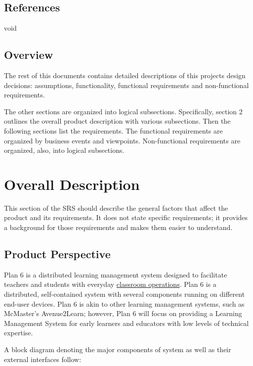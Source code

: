 \documentclass[]{article}
\begin{document}
\subsection{References}
\label{sub:references}
void


\subsection{Overview}
\label{sub:overview}
The rest of this documents contains detailed descriptions of this projects
design decisions: assumptions, functionality, functional requirements and
non-functional requirements.

The other sections are organized into logical subsections. Specifically, section
2 outlines the overall product description with various subsections. Then the
following sections list the requirements. The functional requirements are
organized by business events and viewpoints. Non-functional requirements are
organized, also, into logical subsections.




\section{Overall Description}
\label{sec:overall_description}

This section of the SRS should describe the general factors that affect the
product and its requirements. It does not state specific requirements; it
provides a background for those requirements and makes them easier to
understand.

\subsection{Product Perspective}
\label{sub:product_perspective}
Plan 6 is a distributed learning management system designed to facilitate
teachers and students with everyday \underline{classroom operations}. Plan 6 is
a distributed, self-contained system with several components running on
different end-user devices. Plan 6 is akin to other learning management
systems, such as McMaster's Avenue2Learn; however, Plan 6 will focus on
providing a Learning Management System for early learners and educators with
low levels of technical expertise.

A block diagram denoting the major components of system as well as their
external interfaces follow:
\end{document}
